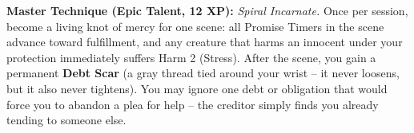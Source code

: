 \begin{tcolorbox}[colback=black!5,colframe=green!70!black,title=\textbf{Pacifist Monk (Oath of Mercy and Grace)},breakable]
  \vspace{2mm}
  \noindent\textbf{Master Technique (Epic Talent, 12 XP):}
  \textit{Spiral Incarnate.} Once per session, become a living knot of mercy for one scene: all Promise Timers in the scene advance toward fulfillment, and any creature that harms an innocent under your protection immediately suffers Harm 2 (Stress). After the scene, you gain a permanent \textbf{Debt Scar} (a gray thread tied around your wrist -- it never loosens, but it also never tightens). You may ignore one debt or obligation that would force you to abandon a plea for help -- the creditor simply finds you already tending to someone else.
\end{tcolorbox}